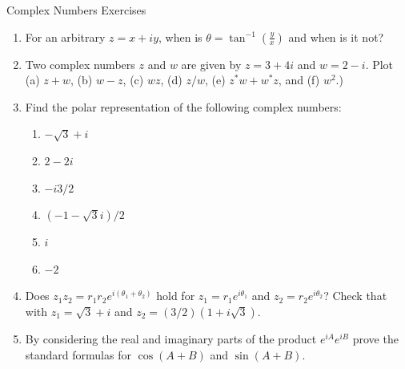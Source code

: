 \documentclass{article}
\begin{document}
\begin{center}
\begin{Huge}Complex Numbers Exercises\end{Huge}
\end{center}

\begin{enumerate}
\item For an arbitrary $z=x+iy$, when is $\theta=\tan^{-1}\left(\frac{y}{x}\right)$ and when is it not?
 
\item Two complex numbers $z$ and $w$ are given by $z=3+4 i$ and $w=2-i$. Plot (a) $z+w$, (b) $w-z$, (c) $wz$, (d) $z / w$, (e) $z^{*} w+w^{*} z$, and (f) $w^{2}$.)

\item  Find the polar representation of the following complex numbers:
\begin{enumerate}
\item $-\sqrt{3}+i$
\item $2-2 i$
\item $-i 3 / 2$
\item $(-1-\sqrt{3} i) / 2$
\item $i$
\item $-2$
\end{enumerate}

\item Does $z_{1} z_{2}=r_{1} r_{2} e^{i\left(\theta_{1}+\theta_{2}\right)}$ hold for $z_{1}=r_{1} e^{i \theta_{1}}$ and $z_{2}=r_{2} e^{i \theta_{2}}$?  Check that with $z_{1}=\sqrt{3}+i$ and $z_{2}=(3 / 2)(1+i \sqrt{3})$.

\item By considering the real and imaginary parts of the product $e^{i A} e^{i B}$ prove the standard formulas for $\cos (A+B)$ and $\sin (A+B)$.



\end{enumerate}
\end{document}
